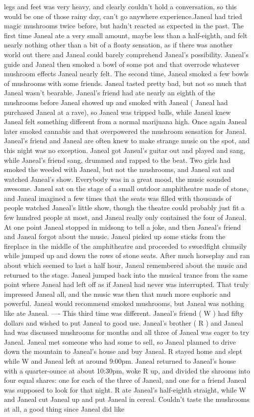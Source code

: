 \documentclass[12pt]{book}
\begin{document}
legs and feet was very heavy, and clearly couldn't hold a conversation, so this would be one of those rainy day, can't go anywhere experience.Janeal had tried magic mushrooms twice before, but hadn't reacted as expected in the past. The first time Janeal ate a very small amount, maybe less than a half-eighth, and felt nearly nothing other than a bit of a floaty sensation, as if there was another world out there and Janeal could barely comprehend Janeal's possibility. Janeal's guide and Janeal then smoked a bowl of some pot and that overrode whatever mushroom effects Janeal nearly felt. The second time, Janeal smoked a few bowls of mushrooms with some friends. Janeal tasted pretty bad, but not so much that Janeal wasn't bearable. Janeal's friend had ate nearly an eighth of the mushrooms before Janeal showed up and smoked with Janeal ( Janeal had purchased Janeal at a rave), so Janeal was tripped balls, while Janeal knew Janeal felt something different from a normal marijuana high. Once again Janeal later smoked cannabis and that overpowered the mushroom sensation for Janeal. Janeal's friend and Janeal are often knew to make strange music on the spot, and this night was no exception. Janeal got Janeal's guitar out and played and sang, while Janeal's friend sang, drummed and rapped to the beat. Two girls had smoked the weeded with Janeal, but not the mushrooms, and Janeal sat and watched Janeal's show. Everybody was in a great mood, the music sounded awesome. Janeal sat on the stage of a small outdoor amphitheatre made of stone, and Janeal imagined a few times that the seats was filled with thousands of people watched Janeal's little show, though the theatre could probably just fit a few hundred people at most, and Janeal really only contained the four of Janeal. At one point Janeal stopped in midsong to tell a joke, and then Janeal's friend and Janeal forgot about the music. Janeal picked up some sticks from the fireplace in the middle of the amphitheatre and proceeded to swordfight clumsily while jumped up and down the rows of stone seats. After much horseplay and ran about which seemed to last a half hour, Janeal remembered about the music and returned to the stage. Janeal jumped back into the musical trance from the same point where Janeal had left off as if Janeal had never was interrupted. That truly impressed Janeal all, and the music was then that much more euphoric and powerful. Janeal would recommend smoked mushrooms, but Janeal was nothing like ate Janeal. ---- This third time was different. Janeal's friend ( W ) had fifty dollars and wished to put Janeal to good use. Janeal's brother ( R ) and Janeal had was discussed mushrooms for months and all three of Janeal was eager to try Janeal. Janeal met someone who had some to sell, so Janeal planned to drive down the mountain to Janeal's house and buy Janeal. R stayed home and slept while W and Janeal left at around 9:00pm. Janeal returned to Janeal's house with a quarter-ounce at about 10:30pm, woke R up, and divided the shrooms into four equal shares: one for each of the three of Janeal, and one for a friend Janeal was supposed to look for that night. R ate Janeal's half-eighth straight, while W and Janeal cut Janeal up and put Janeal in cereal. Couldn't taste the mushrooms at all, a good thing since Janeal did like 
\end{document}
